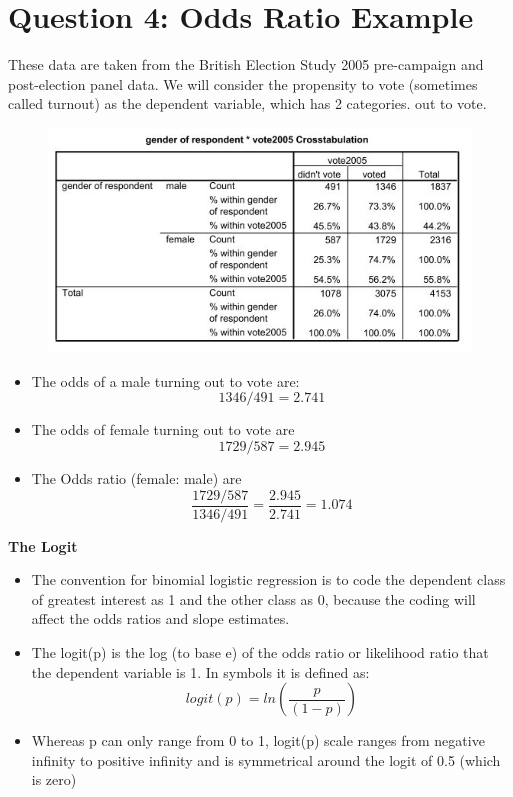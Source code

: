 \documentclass[a4paper,12pt]{article}
\begin{document}
\section*{Question 4: Odds Ratio Example}
	These data are taken from the British Election Study 2005 pre-campaign and
	post-election panel data. We will consider the propensity to vote (sometimes called turnout) as the
	dependent variable, which has 2 categories. 
	out to vote.
	\begin{center}
		\begin{figure}[h!]
			\includegraphics[scale=0.8]{LogWeek10A}\\
		\end{figure}
	\end{center}
\begin{itemize}
	\item The odds of a male turning out to vote are:
	\[1346/491 = 2.741\]
	\item The odds of female turning out to vote are
	\[1729/587 = 2.945\]
	\item The Odds ratio (female: male) are
	\[ \frac{1729/587 }{ 1346/491 } = \frac{2.945}{2.741}= 1.074\]
\end{itemize}	

\newpage
\begin{framed}
\noindent \textbf{The Logit}\\
\begin{itemize}
	\item 		The convention for binomial logistic regression is to code the
	dependent class of greatest interest as 1 and the other class as 0, because the coding will
	affect the odds ratios and slope estimates.
	
\item 	The logit(p) is the log (to base e) of the odds ratio or likelihood ratio that the dependent
	variable is 1. In symbols it is defined as:
	\[ logit(p) = ln \left(\frac{p}{(1-p)}\right) \]
	
\item	Whereas p can only range from 0 to 1, logit(p) scale ranges from negative infinity to positive
	infinity and is symmetrical around the logit of 0.5 (which is zero)
\end{itemize}

\end{framed}
\end{document}
